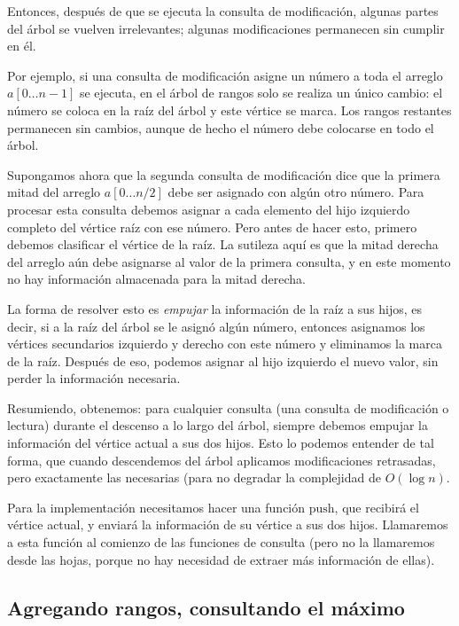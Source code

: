 Entonces, después de que se ejecuta la consulta de modificación, algunas partes del árbol se vuelven irrelevantes; algunas modificaciones permanecen sin cumplir en él.

Por ejemplo, si una consulta de modificación asigne un número a toda el arreglo $a[0 \dots n-1]$ se ejecuta, en el árbol de rangos solo se realiza un único cambio: el número se coloca en la raíz del árbol y este vértice se marca. Los rangos restantes permanecen sin cambios, aunque de hecho el número debe colocarse en todo el árbol.

Supongamos ahora que la segunda consulta de modificación dice que la primera mitad del arreglo $a[0 \dots n/2]$ debe ser asignado con algún otro número. Para procesar esta consulta debemos asignar a cada elemento del hijo izquierdo completo del vértice raíz con ese número. Pero antes de hacer esto, primero debemos clasificar el vértice de la raíz. La sutileza aquí es que la mitad derecha del arreglo aún debe asignarse al valor de la primera consulta, y en este momento no hay información almacenada para la mitad derecha.

La forma de resolver esto es \emph{empujar} la información de la raíz a sus hijos, es decir, si a la raíz del árbol se le asignó algún número, entonces asignamos los vértices secundarios izquierdo y derecho con este número y eliminamos la marca de la raíz. Después de eso, podemos asignar al hijo izquierdo el nuevo valor, sin perder la información necesaria.

Resumiendo, obtenemos: para cualquier consulta (una consulta de modificación o lectura) durante el descenso a lo largo del árbol, siempre debemos empujar la información del vértice actual a sus dos hijos. Esto lo podemos entender de tal forma, que cuando descendemos del árbol aplicamos modificaciones retrasadas, pero exactamente las necesarias (para no degradar la complejidad de $O(\log n)$.

Para la implementación necesitamos hacer una función $\text{push}$, que recibirá el vértice actual, y enviará la información de su vértice a sus dos hijos. Llamaremos a esta función al comienzo de las funciones de consulta (pero no la llamaremos desde las hojas, porque no hay necesidad de extraer más información de ellas).

\subsection{Agregando rangos, consultando el máximo}

